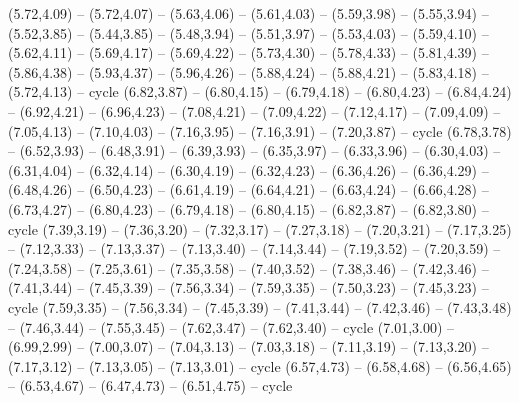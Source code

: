 \expandafter\def\csname geo:gebiet:CYN\endcsname{
  }
\expandafter\def\csname geo:gebiet:CYP\endcsname{
  }
\expandafter\def\csname geo:gebiet:MAR\endcsname{
  (5.72,4.09) -- (5.72,4.07) -- (5.63,4.06) -- (5.61,4.03) -- (5.59,3.98) -- (5.55,3.94) -- (5.52,3.85) -- (5.44,3.85) -- (5.48,3.94) -- (5.51,3.97) -- (5.53,4.03) -- (5.59,4.10) -- (5.62,4.11) -- (5.69,4.17) -- (5.69,4.22) -- (5.73,4.30) -- (5.78,4.33) -- (5.81,4.39) -- (5.86,4.38) -- (5.93,4.37) -- (5.96,4.26) -- (5.88,4.24) -- (5.88,4.21) -- (5.83,4.18) -- (5.72,4.13) -- cycle}
\expandafter\def\csname geo:gebiet:EGY\endcsname{
  (6.82,3.87) -- (6.80,4.15) -- (6.79,4.18) -- (6.80,4.23) -- (6.84,4.24) -- (6.92,4.21) -- (6.96,4.23) -- (7.08,4.21) -- (7.09,4.22) -- (7.12,4.17) -- (7.09,4.09) -- (7.05,4.13) -- (7.10,4.03) -- (7.16,3.95) -- (7.16,3.91) -- (7.20,3.87) -- cycle}
\expandafter\def\csname geo:gebiet:LBY\endcsname{
  (6.78,3.78) -- (6.52,3.93) -- (6.48,3.91) -- (6.39,3.93) -- (6.35,3.97) -- (6.33,3.96) -- (6.30,4.03) -- (6.31,4.04) -- (6.32,4.14) -- (6.30,4.19) -- (6.32,4.23) -- (6.36,4.26) -- (6.36,4.29) -- (6.48,4.26) -- (6.50,4.23) -- (6.61,4.19) -- (6.64,4.21) -- (6.63,4.24) -- (6.66,4.28) -- (6.73,4.27) -- (6.80,4.23) -- (6.79,4.18) -- (6.80,4.15) -- (6.82,3.87) -- (6.82,3.80) -- cycle}
\expandafter\def\csname geo:gebiet:ETH\endcsname{
  (7.39,3.19) -- (7.36,3.20) -- (7.32,3.17) -- (7.27,3.18) -- (7.20,3.21) -- (7.17,3.25) -- (7.12,3.33) -- (7.13,3.37) -- (7.13,3.40) -- (7.14,3.44) -- (7.19,3.52) -- (7.20,3.59) -- (7.24,3.58) -- (7.25,3.61) -- (7.35,3.58) -- (7.40,3.52) -- (7.38,3.46) -- (7.42,3.46) -- (7.41,3.44) -- (7.45,3.39) -- (7.56,3.34) -- (7.59,3.35) -- (7.50,3.23) -- (7.45,3.23) -- cycle}
\expandafter\def\csname geo:gebiet:DJI\endcsname{
  }
\expandafter\def\csname geo:gebiet:SOL\endcsname{
  (7.59,3.35) -- (7.56,3.34) -- (7.45,3.39) -- (7.41,3.44) -- (7.42,3.46) -- (7.43,3.48) -- (7.46,3.44) -- (7.55,3.45) -- (7.62,3.47) -- (7.62,3.40) -- cycle}
\expandafter\def\csname geo:gebiet:UGA\endcsname{
  (7.01,3.00) -- (6.99,2.99) -- (7.00,3.07) -- (7.04,3.13) -- (7.03,3.18) -- (7.11,3.19) -- (7.13,3.20) -- (7.17,3.12) -- (7.13,3.05) -- (7.13,3.01) -- cycle}
\expandafter\def\csname geo:gebiet:RWA\endcsname{
  }
\expandafter\def\csname geo:gebiet:BIH\endcsname{
  (6.57,4.73) -- (6.58,4.68) -- (6.56,4.65) -- (6.53,4.67) -- (6.47,4.73) -- (6.51,4.75) -- cycle}
\expandafter\def\csname geo:gebiet:MKD\endcsname{
  }

